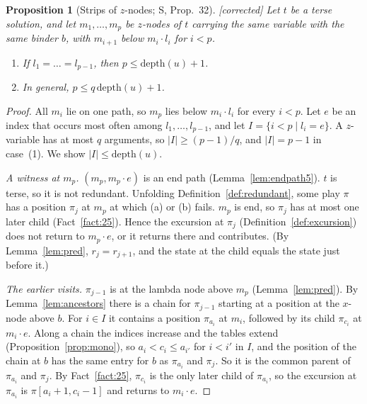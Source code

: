 \documentclass[11pt]{article}
\newcommand{\depth}{\mathrm{depth}}
\newcommand{\suc}[2]{#1{\cdot}#2}
\newcommand{\iv}[2]{\pi[#1,#2]}
\newcommand{\Fixed}{\textsf{[corrected]}}
\theoremstyle{plain}
\newtheorem{proposition}[theorem]{Proposition}
\theoremstyle{definition}
\theoremstyle{remark}
\begin{document}
\begin{proposition}[Strips of $z$-nodes; S, Prop.~32]\label{prop:stacking}
\Fixed{} Let $t$ be a terse solution, and let $m_1,\dots,m_p$ be
$z$-nodes of $t$ carrying the same variable with the same binder $b$,
with $m_{i+1}$ below $\suc{m_i}{l_i}$ for $i<p$.
\begin{enumerate}
\item If $l_1=\dots=l_{p-1}$, then $p\le\depth(u)+1$.
\item In general, $p\le q\,\depth(u)+1$.
\end{enumerate}
\end{proposition}
\begin{proof}
All $m_i$ lie on one path, so $m_p$ lies below $\suc{m_i}{l_i}$ for every
$i<p$.  Let $e$ be an index that occurs most often among
$l_1,\dots,l_{p-1}$, and let $I=\{i<p\mid l_i=e\}$.  A $z$-variable has
at most $q$ arguments, so $|I|\ge(p-1)/q$, and $|I|=p-1$ in case~(1).
We show $|I|\le\depth(u)$.

\emph{A witness at $m_p$.}  $(m_p,\suc{m_p}e)$ is an end path
(Lemma~\ref{lem:endpath5}).  $t$ is terse, so it is not redundant.
Unfolding Definition~\ref{def:redundant}, some play $\pi$ has a position
$\pi_j$ at $m_p$ at which (a) or (b) fails.  $m_p$ is end, so $\pi_j$
has at most one later child (Fact~\ref{fact:25}).  Hence the excursion
at $\pi_j$ (Definition~\ref{def:excursion}) does not return to
$\suc{m_p}e$, or it returns there and contributes.  (By
Lemma~\ref{lem:pred}, $r_j=r_{j+1}$, and the state at the child equals
the state just before it.)

\emph{The earlier visits.}  $\pi_{j-1}$ is at the lambda node above
$m_p$ (Lemma~\ref{lem:pred}).  By Lemma~\ref{lem:ancestors} there is a
chain for $\pi_{j-1}$ starting at a position at the $x$-node above $b$.
For $i\in I$ it contains a position $\pi_{a_i}$ at $m_i$, followed by
its child $\pi_{c_i}$ at $\suc{m_i}e$.  Along a chain the indices
increase and the tables extend (Proposition~\ref{prop:mono}), so
$a_i<c_i\le a_{i'}$ for $i<i'$ in $I$, and the position of the chain at
$b$ has the same entry for $b$ as $\pi_{a_i}$ and $\pi_j$.  So it is the
common parent of $\pi_{a_i}$ and $\pi_j$.  By Fact~\ref{fact:25},
$\pi_{c_i}$ is the only later child of $\pi_{a_i}$, so the excursion at
$\pi_{a_i}$ is $\iv{a_i+1}{c_i-1}$ and returns to $\suc{m_i}e$.


\end{proof}
\end{document}
